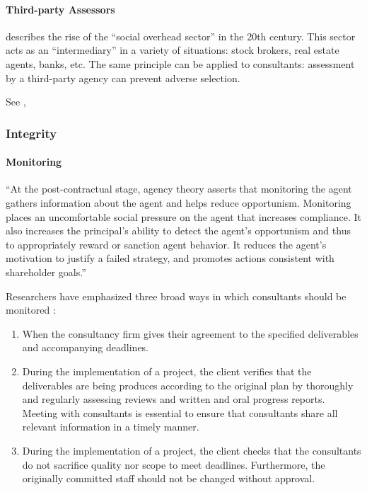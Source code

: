 \documentclass[12pt]{article}
\providecommand{\tightlist}{%
  \setlength{\itemsep}{0pt}\setlength{\parskip}{0pt}}
\begin{document}
\hypertarget{third-party-assessors}{%
\paragraph{Third-party Assessors}\label{third-party-assessors}}

\citet[57-62]{zucker1985} describes the rise of the ``social overhead
sector'' in the 20th century. This sector acts as an ``intermediary'' in
a variety of situations: stock brokers, real estate agents, banks, etc.
The same principle can be applied to consultants: assessment by a
third-party agency can prevent adverse selection.

See \citep[ 76-77]{armbruster2006},

\hypertarget{integrity}{%
\subsubsection{Integrity}\label{integrity}}

\hypertarget{monitoring}{%
\paragraph{Monitoring}\label{monitoring}}

``At the post-contractual stage, agency theory asserts that monitoring
the agent gathers information about the agent and helps reduce
opportunism. Monitoring places an uncomfortable social pressure on the
agent that increases compliance. It also increases the principal's
ability to detect the agent's opportunism and thus to appropriately
reward or sanction agent behavior. It reduces the agent's motivation to
justify a failed strategy, and promotes actions consistent with
shareholder goals.'' \citep[ 13]{basu2011}

Researchers have emphasized three broad ways in which consultants should
be monitored \citep[ 15]{basu2011}:

\begin{enumerate}
\def\labelenumi{\arabic{enumi}.}
\tightlist
\item
  When the consultancy firm gives their agreement to the specified
  deliverables and accompanying deadlines.
\item
  During the implementation of a project, the client verifies that the
  deliverables are being produces according to the original plan by
  thoroughly and regularly assessing reviews and written and oral
  progress reports. Meeting with consultants is essential to ensure that
  consultants share all relevant information in a timely manner.
\item
  During the implementation of a project, the client checks that the
  consultants do not sacrifice quality nor scope to meet deadlines.
  Furthermore, the originally committed staff should not be changed
  without approval.
\end{enumerate}
\end{document}
